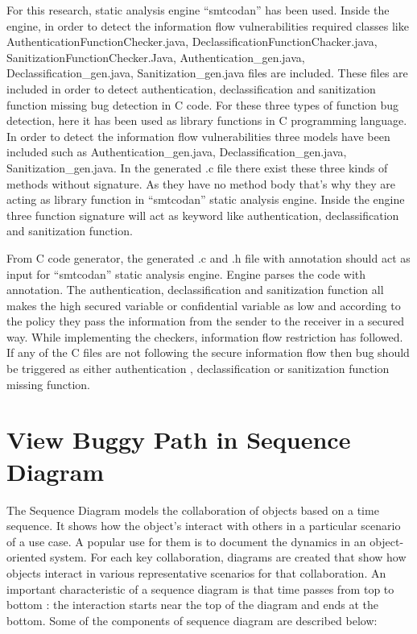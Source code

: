 For this research, static analysis engine \enquote{smtcodan}  has been used. Inside the engine, in order to detect the information flow vulnerabilities required classes like AuthenticationFunctionChecker.java, DeclassificationFunctionChacker.java, SanitizationFunctionChecker.Java, Authentication\_gen.java,\\
Declassification\_gen.java,
Sanitization\_gen.java files are included. These files are included in order to detect authentication, declassification and sanitization function missing bug detection in C code. For these three types of function bug detection, here it has been used as library functions in C programming language. In order to detect the information flow vulnerabilities three models have been included such as Authentication\_gen.java,
Declassification\_gen.java,
Sanitization\_gen.java. In the generated .c file there exist these three kinds of methods without signature. As they have no method body that's why they are acting as library function in \enquote{smtcodan} static analysis engine. Inside the engine three function signature will act as keyword like authentication, declassification and sanitization function.

From C code generator, the generated .c and .h file with annotation should act as input for \enquote{smtcodan} static analysis engine. Engine parses the code with annotation. The authentication, declassification and sanitization function all makes the high secured variable or confidential variable as low and according to the policy they pass the information from the sender to the receiver in a secured way. While implementing the checkers, information flow restriction has followed. If any of the C files are not following the secure information flow then bug should be triggered as either authentication , declassification or sanitization function missing function.

\section{View Buggy Path in Sequence Diagram}

The Sequence Diagram models the collaboration of objects based on a time sequence. It shows how the object's interact with others in a particular scenario of a use case. A popular use for them is to document the dynamics in an object-oriented system.  For each key collaboration, diagrams are created that show how objects interact in various representative scenarios for that collaboration. An important characteristic of a sequence diagram is that time passes from top to bottom : the interaction starts near the top of the diagram and ends at the bottom. Some of the components of sequence diagram \cite{ref_107_visual-paradigm:visual-paradigm} are described below:

